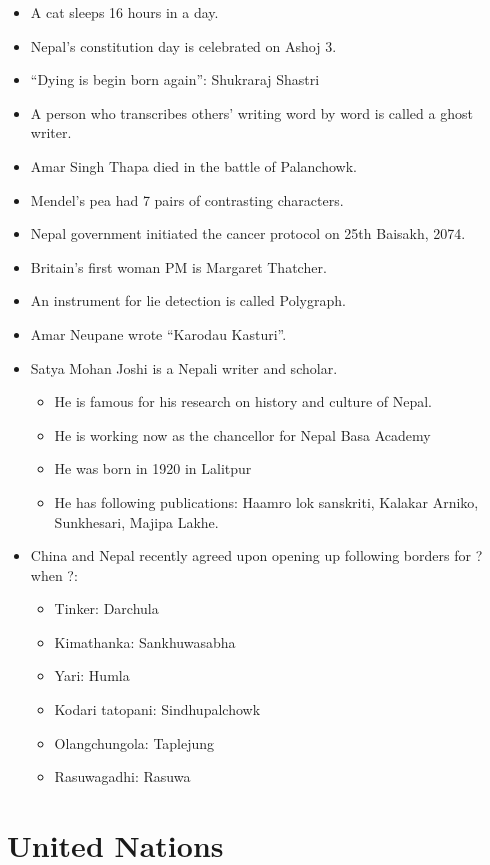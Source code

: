 \documentclass[
  openany]{book}
\providecommand{\tightlist}{%
  \setlength{\itemsep}{0pt}\setlength{\parskip}{0pt}}
\begin{document}
\begin{itemize}
\item
  A cat sleeps 16 hours in a day.
\item
  Nepal's constitution day is celebrated on Ashoj 3.
\item
  ``Dying is begin born again'': Shukraraj Shastri
\item
  A person who transcribes others' writing word by word is called a ghost writer.
\item
  Amar Singh Thapa died in the battle of Palanchowk.
\item
  Mendel's pea had 7 pairs of contrasting characters.
\item
  Nepal government initiated the cancer protocol on 25th Baisakh, 2074.
\item
  Britain's first woman PM is Margaret Thatcher.
\item
  An instrument for lie detection is called Polygraph.
\item
  Amar Neupane wrote ``Karodau Kasturi''.
\item
  Satya Mohan Joshi is a Nepali writer and scholar.

  \begin{itemize}
  \tightlist
  \item
    He is famous for his research on history and culture of Nepal.
  \item
    He is working now as the chancellor for Nepal Basa Academy
  \item
    He was born in 1920 in Lalitpur
  \item
    He has following publications: Haamro lok sanskriti, Kalakar Arniko, Sunkhesari, Majipa Lakhe.
  \end{itemize}
\item
  China and Nepal recently agreed upon opening up following borders for ? when ?:

  \begin{itemize}
  \tightlist
  \item
    Tinker: Darchula
  \item
    Kimathanka: Sankhuwasabha
  \item
    Yari: Humla
  \item
    Kodari tatopani: Sindhupalchowk
  \item
    Olangchungola: Taplejung
  \item
    Rasuwagadhi: Rasuwa
  \end{itemize}
\end{itemize}

\hypertarget{united-nations}{%
\section{United Nations}\label{united-nations}}
\end{document}
